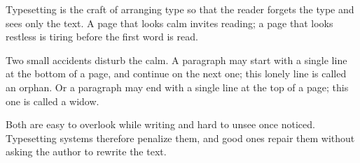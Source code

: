 Typesetting is the craft of arranging type so that the reader forgets the type and sees only the text. A page that looks calm invites reading; a page that looks restless is tiring before the first word is read.

Two small accidents disturb the calm. A paragraph may start with a single line at the bottom of a page, and continue on the next one; this lonely line is called an orphan. Or a paragraph may end with a single line at the top of a page; this one is called a widow.

Both are easy to overlook while writing and hard to unsee once noticed. Typesetting systems therefore penalize them, and good ones repair them without asking the author to rewrite the text.
